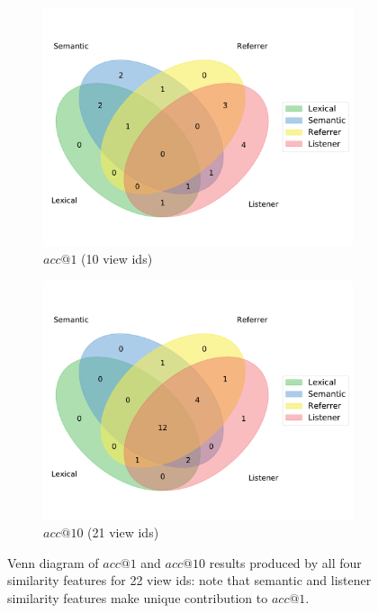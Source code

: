 \documentclass[sigconf]{acmart}
\begin{document}
\begin{figure}[ht]
  \centering
  \begin{subfigure}{0.4\textwidth}
    \includegraphics[width=\textwidth]{images/4_features_acc1.pdf}
    \caption{$acc@1$ (10 view ids)\label{fig:venn_4_1}}
  \end{subfigure}
  \hspace{1em}
  \begin{subfigure}{0.4\textwidth}
    \includegraphics[width=\textwidth]{images/4_features_acc10.pdf}
    \caption{$acc@10$ (21 view ids)\label{fig:venn_4_10}}
  \end{subfigure}
  \caption{Venn diagram of $acc@1$ and $acc@10$ results produced by all four similarity features for 22 view ids: note that semantic and listener similarity features make unique contribution to $acc@1$.\label{fig:venn_4}}
\end{figure}
\end{document}
